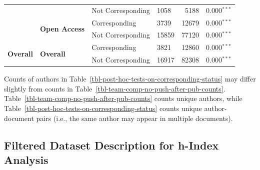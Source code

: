\documentclass[
  letterpaper,
  DIV=11,
  numbers=noendperiod]{scrartcl}
\begin{document}
\begin{table}
{\begin{tabular}{llllrr}
    & & \cellcolor{gray!10}Not Corresponding & \cellcolor{gray!10}1058 & \cellcolor{gray!10}5188 & \cellcolor{gray!10}0.000$^{***}$ \\
    & \multirow{2}{*}{\textbf{Open Access}} & Corresponding & 3739 & 12679 & 0.000$^{***}$ \\
    & & \cellcolor{gray!10}Not Corresponding & \cellcolor{gray!10}15859 & \cellcolor{gray!10}77120 & \cellcolor{gray!10}0.000$^{***}$ \\
    \midrule
    \multirow{2}{*}{\textbf{Overall}} & \multirow{2}{*}{\textbf{Overall}} & Corresponding & 3821 & 12860 & 0.000$^{***}$ \\
    & & \cellcolor{gray!10}Not Corresponding & \cellcolor{gray!10}16917 & \cellcolor{gray!10}82308 & \cellcolor{gray!10}0.000$^{***}$ \\
\bottomrule
\end{tabular}

}

\end{table}%

Counts of authors in
Table~\ref{tbl-post-hoc-tests-on-corresponding-status} may differ
slightly from counts in
Table~\ref{tbl-team-comp-no-push-after-pub-counts}.
Table~\ref{tbl-team-comp-no-push-after-pub-counts} counts unique
authors, while Table~\ref{tbl-post-hoc-tests-on-corresponding-status}
counts unique author-document pairs (i.e., the same author may appear in
multiple documents).

\subsection{Filtered Dataset Description for h-Index
Analysis}\label{filtered-dataset-description-for-h-index-analysis}
\end{document}
